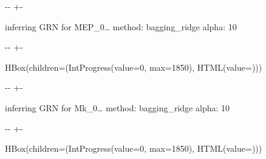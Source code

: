 \documentclass[letterpaper,10pt,english]{sphinxmanual}
\newlength\nbsphinxcodecellspacing
\begin{document}
%
{
\kern-\sphinxverbatimsmallskipamount\kern-\baselineskip
\kern+\FrameHeightAdjust\kern-\fboxrule
\vspace{\nbsphinxcodecellspacing}
%
\begin{sphinxVerbatim}[commandchars=\\\{\}]

inferring GRN for MEP\_0{\ldots}
method: bagging\_ridge
alpha: 10
\end{sphinxVerbatim}
}
\relax

{

\kern-\sphinxverbatimsmallskipamount\kern-\baselineskip
\kern+\FrameHeightAdjust\kern-\fboxrule
\vspace{\nbsphinxcodecellspacing}

%
\begin{sphinxVerbatim}[commandchars=\\\{\}]
HBox(children=(IntProgress(value=0, max=1850), HTML(value=\PYGZsq{}\PYGZsq{})))
\end{sphinxVerbatim}
}



%
{
\kern-\sphinxverbatimsmallskipamount\kern-\baselineskip
\kern+\FrameHeightAdjust\kern-\fboxrule
\vspace{\nbsphinxcodecellspacing}
%
\begin{sphinxVerbatim}[commandchars=\\\{\}]

inferring GRN for Mk\_0{\ldots}
method: bagging\_ridge
alpha: 10
\end{sphinxVerbatim}
}
\relax

{

\kern-\sphinxverbatimsmallskipamount\kern-\baselineskip
\kern+\FrameHeightAdjust\kern-\fboxrule
\vspace{\nbsphinxcodecellspacing}

%
\begin{sphinxVerbatim}[commandchars=\\\{\}]
HBox(children=(IntProgress(value=0, max=1850), HTML(value=\PYGZsq{}\PYGZsq{})))
\end{sphinxVerbatim}
}
\end{document}
